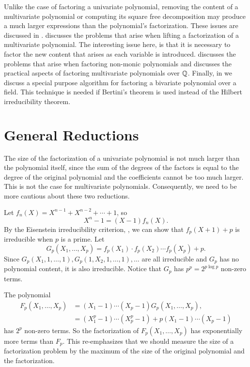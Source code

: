Unlike the case of factoring a univariate polynomial, removing the
content of a multivariate polynomial or computing its square free
decomposition may produce a much larger expressions than the
polynomial's factorization.  These issues are discussed in
.   discusses the
problems that arise when lifting a factorization of a multivariate
polynomial.  The interesting issue here, is that it is necessary to
factor the new content that arises as each variable is introduced.
 discusses the problems that arise when factoring
non-monic polynomials and  discusses the
practical aspects of factoring multivariate polynomials over $\mathbb{Q}$.
Finally, in  we discuss a special purpose
algorithm for factoring a bivariate polynomial over a field.  This
technique is needed if Bertini's theorem is used instead of the
Hilbert irreducibility theorem.

\section{General Reductions}
\label{GF:Reductions:Sec}

The size of the factorization of a univariate polynomial is not much
larger than the polynomial itself, since the sum of the degrees of the
factors is equal to the degree of the original polynomial and the
coefficients cannot be too much larger.  This is not the case for
multivariate polynomials.  Consequently, we need to be more cautious
about these two reductions.

Let $f_n(X) = X^{n-1} + X^{n-2} + \cdots + 1$, so 
\[
X^n - 1 = (X - 1) f_n(X).
\]
By the Eisenstein irreducibility criterion, ,
we can show that $f_p(X+1)+p$ is irreducible when $p$ is a prime.  Let
\[
G_p(X_1, \ldots, X_p) = f_p(X_1) \cdot f_p(X_2) \cdots f_p(X_p) + p.
\]
Since $G_p(X_1, 1, \ldots, 1), G_p(1, X_2, 1, \ldots, 1), \ldots$ are all
irreducible and $G_p$ has no polynomial content, it is also
irreducible.  Notice that $G_p$ has $p^p = 2 ^{p\log p}$ non-zero
terms. 

The polynomial
\[
\begin{aligned}
F_p(X_1, \ldots, X_p) 
   & = (X_1 - 1) \cdots (X_p - 1) G_p(X_1, \ldots, X_p), \\
   & = (X_1^p - 1) \cdots (X_p^p - 1) + p (X_1 - 1) \cdots (X_p - 1)
\end{aligned}
\]
has $2^p$ non-zero terms.  So the factorization of $F_p(X_1, \ldots,
X_p)$ has exponentially more terms than $F_p$.  This re-emphasizes
that we should measure the size of a factorization problem by the
maximum of the size of the original polynomial and the factorization.

